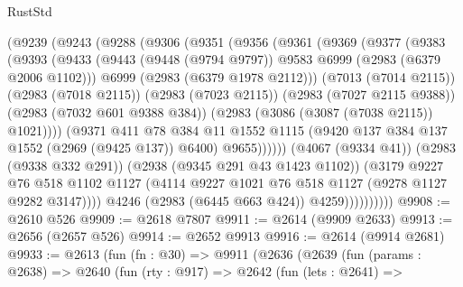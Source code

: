 \begin{lexlean}{RustStd}
\begin{coremodule}
                  (@9239
                    (@9243
                      (@9288
                        (@9306
                          (@9351
                            (@9356
                              (@9361
                                (@9369
                                  (@9377
                                    (@9383
                                      (@9393
                                        (@9433
                                          (@9443
                                            (@9448 (@9794 @9797))
                                            @9583
                                            @6999
                                            (@2983 (@6379 @2006 @1102)))
                                          @6999
                                          (@2983 (@6379 @1978 @2112)))
                                        (@7013 (@7014 @2115))
                                        (@2983 (@7018 @2115))
                                        (@2983 (@7023 @2115))
                                        (@2983 (@7027 @2115 @9388))
                                        (@2983 (@7032 @601 @9388 @384))
                                        (@2983 (@3086 (@3087 (@7038 @2115)) @1021))))
                                    (@9371
                                      @411
                                      @78
                                      @384
                                      @11
                                      @1552
                                      @1115
                                      (@9420 @137 @384 @137 @1552 (@2969 (@9425 @137)) @6400)
                                      @9655))))))
                          (@4067 (@9334 @41))
                          (@2983 (@9338 @332 @291))
                          (@2938 (@9345 @291 @43 @1423 @1102))
                          (@3179
                            @9227
                            @76
                            @518
                            @1102
                            @1127
                            (@4114 @9227 @1021 @76 @518 @1127 (@9278 @1127 @9282 @3147))))
                        @4246
                        (@2983 (@6445 @663 @424))
                        @4259))))))))))
@9908 := @2610 @526
@9909 := @2618 @7807
@9911 := @2614 (@9909 @2633)
@9913 := @2656 (@2657 @526)
@9914 := @2652 @9913
@9916 := @2614 (@9914 @2681)
@9933 := @2613
    (fun (fn : @30) =>
    @9911
      (@2636
        (@2639
          (fun (params : @2638) =>
          @2640
            (fun (rty : @917) =>
            @2642
              (fun (lets : @2641) =>

\end{coremodule}
\end{lexlean}
